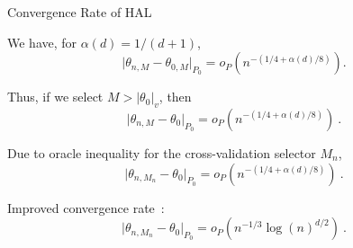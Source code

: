 \documentclass{beamer}
\begin{document}
\begin{frame}{Convergence Rate of HAL}
\vspace{0.25cm}

We have, for $\alpha(d)=1/(d+1)$,
\[
  \lvert \theta_{n,M} - \theta_{0,M} \rvert_{P_0}=o_P(n^{-(1/4+\alpha(d)/8)}).
\]

Thus, if we select $M> \lvert \theta_0 \rvert_v$, then
\[
  \lvert \theta_{n,M} - \theta_{0} \rvert_{P_0} =
  o_P(n^{-(1/4+\alpha(d)/8)})\ .
\]

Due to oracle inequality for the cross-validation selector $M_n$,
\[
  \lvert \theta_{n,M_n} - \theta_{0} \rvert_{P_0} =
  o_P(n^{-(1/4+\alpha(d)/8)}) \ .
\]

Improved convergence rate~\citep{bibaut2019fast}:
\[
  \lvert \theta_{n,M_n} - \theta_{0} \rvert_{P_0} =
  o_P(n^{-1/3} \log(n)^{d/2}) \ .
\]


\end{frame}

\end{document}
